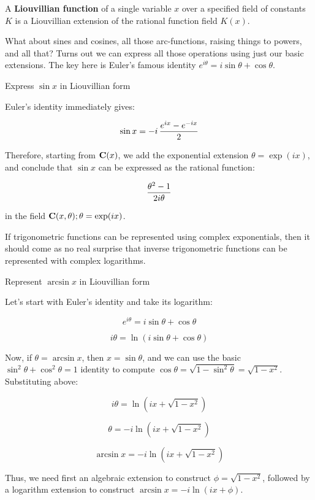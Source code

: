 \enddefinition


A {\bf Liouvillian function} of a single variable $x$ over a specified
field of constants $K$ is a Liouvillian extension of the rational
function field $K(x)$.

\enddefinition

What about sines and cosines, all those arc-functions, raising things
to powers, and all that?  Turns out we can express all those
operations using just our basic extensions.  The key here is Euler's
famous identity $e^{i\theta}=i\sin\theta+\cos\theta$.

\example

Express $\sin x$ in Liouvillian form

Euler's identity immediately gives:

$$\sin x = {-i \,{{e^{ix} - e^{-ix}}\over 2}}$$

Therefore, starting from ${\bf C}(x)$,
we add the exponential extension $\theta = \exp(ix)$,
and conclude that $\sin x$ can be expressed as the rational function:

$${{\theta^2 - 1}\over 2i\theta}$$

in the field ${\bf C}(x,\theta); \theta=\exp(ix)$.

\endexample

If trigonometric functions can be represented using complex
exponentials, then it should come as no real surprise that inverse
trigonometric functions can be represented with complex logarithms.

\example Represent $\arcsin x$ in Liouvillian form

Let's start with Euler's identity and take its logarithm:

$$e^{i\theta}=i\sin\theta+\cos\theta$$

$$i\theta=\ln(i\sin\theta+\cos\theta)$$

Now, if $\theta = \arcsin x$, then $x = \sin \theta$, and we can use
the basic $\sin^2 \theta + \cos^2 \theta = 1$ identity to compute
$\cos \theta = \sqrt{1-\sin^2\theta} = \sqrt{1-x^2}$.  Substituting above:

$$i\theta=\ln(i x+\sqrt{1-x^2})$$

$$\theta=-i\ln(i x+\sqrt{1-x^2})$$

$$\arcsin x=-i\ln(i x+\sqrt{1-x^2})$$

Thus, we need first an algebraic extension to construct $\phi = \sqrt{1-x^2}$,
followed by a logarithm extension to construct $\arcsin x = -i\ln(ix+\phi)$.

